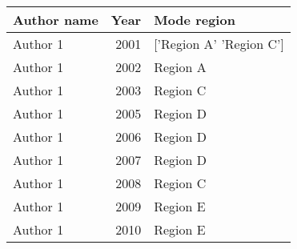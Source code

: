 \begin{tabular}{lrl}
\hline
 Author name   &   Year & Mode region             \\
\hline
 Author 1      &   2001 & ['Region A' 'Region C'] \\
 Author 1      &   2002 & Region A                \\
 Author 1      &   2003 & Region C                \\
 Author 1      &   2005 & Region D                \\
 Author 1      &   2006 & Region D                \\
 Author 1      &   2007 & Region D                \\
 Author 1      &   2008 & Region C                \\
 Author 1      &   2009 & Region E                \\
 Author 1      &   2010 & Region E                \\
\hline
\end{tabular}